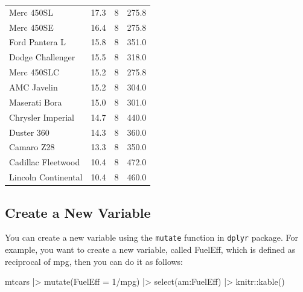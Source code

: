 \documentclass[
  letterpaper,
  paper =a4,
  twoside,
  openright,
  headsepline,
  footsepline,
  listof = totocnumbered,
  chapterprefix = true,
  firstiscover]{scrbook}
\newenvironment{Shaded}{\begin{snugshade}}{\end{snugshade}}
\newcommand{\AttributeTok}[1]{\textcolor[rgb]{0.40,0.45,0.13}{#1}}
\newcommand{\DecValTok}[1]{\textcolor[rgb]{0.68,0.00,0.00}{#1}}
\newcommand{\FunctionTok}[1]{\textcolor[rgb]{0.28,0.35,0.67}{#1}}
\newcommand{\NormalTok}[1]{\textcolor[rgb]{0.00,0.23,0.31}{#1}}
\newcommand{\SpecialCharTok}[1]{\textcolor[rgb]{0.37,0.37,0.37}{#1}}
\begin{document}
\begin{longtable}[]{@{}lrrr@{}}
Merc 450SL & 17.3 & 8 & 275.8 \\
Merc 450SE & 16.4 & 8 & 275.8 \\
Ford Pantera L & 15.8 & 8 & 351.0 \\
Dodge Challenger & 15.5 & 8 & 318.0 \\
Merc 450SLC & 15.2 & 8 & 275.8 \\
AMC Javelin & 15.2 & 8 & 304.0 \\
Maserati Bora & 15.0 & 8 & 301.0 \\
Chrysler Imperial & 14.7 & 8 & 440.0 \\
Duster 360 & 14.3 & 8 & 360.0 \\
Camaro Z28 & 13.3 & 8 & 350.0 \\
Cadillac Fleetwood & 10.4 & 8 & 472.0 \\
Lincoln Continental & 10.4 & 8 & 460.0 \\
\end{longtable}

\hypertarget{create-a-new-variable}{%
\subsection{Create a New Variable}\label{create-a-new-variable}}

You can create a new variable using the \texttt{mutate} function in
\texttt{dplyr} package. For example, you want to create a new variable,
called FuelEff, which is defined as reciprocal of mpg, then you can do
it as follows:

\begin{Shaded}
\begin{Highlighting}[numbers=left,,]
\NormalTok{mtcars }\SpecialCharTok{|\textgreater{}} \FunctionTok{mutate}\NormalTok{(}\AttributeTok{FuelEff =} \DecValTok{1}\SpecialCharTok{/}\NormalTok{mpg) }\SpecialCharTok{|\textgreater{}} \FunctionTok{select}\NormalTok{(am}\SpecialCharTok{:}\NormalTok{FuelEff) }\SpecialCharTok{|\textgreater{}}\NormalTok{ knitr}\SpecialCharTok{::}\FunctionTok{kable}\NormalTok{()}
\end{Highlighting}
\end{Shaded}
\end{document}
